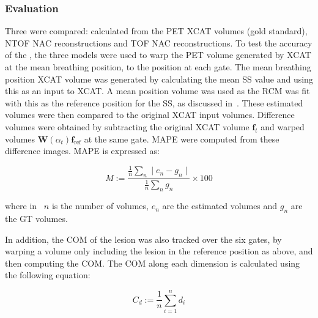             \subsubsection{Evaluation} \label{sec:impact_of_tof_on_respiratory_motion_model_estimation_using_pre_gated_no_intra_cycle_motion_nac_pet_methods_evaluation}
                Three  were compared: calculated from the \gls{PET} \gls{XCAT} volumes (gold standard), \gls{NTOF} \gls{NAC} reconstructions and \gls{TOF} \gls{NAC} reconstructions. To test the accuracy of the , the three models were used to warp the \gls{PET} volume generated by \gls{XCAT} at the mean breathing position, to the position at each gate. The mean breathing position \gls{XCAT} volume was generated by calculating the mean \gls{SS} value and using this as an input to \gls{XCAT}. A mean position volume was used as the \gls{RCM} was fit with this as the reference position for the \gls{SS}, as discussed in~. These estimated volumes were then compared to the original \gls{XCAT} input volumes. Difference volumes were obtained by subtracting the original \gls{XCAT} volume $\mathbf{f}_t$ and warped volumes $\mathbf{W}(\alpha_t) \mathbf{f}_\mathrm{ref}$ at the same gate. \gls{MAPE} were computed from these difference images. \gls{MAPE} is expressed as:
                
                \begin{equation} \label{eq:impact_of_tof_on_respiratory_motion_model_estimation_using_pre_gated_no_intra_cycle_motion_nac_pet_methods_mape}
                   M := \frac{\frac{1}{n}\sum_{n}\mid e_n - g_n \mid}{\frac{1}{n}\sum_{n}g_n} \times 100
                \end{equation}
                
                \noindent where in~ $n$ is the number of volumes, $e_n$ are the estimated volumes and $g_n$ are the \gls{GT} volumes.
                
                In addition, the \gls{COM} of the lesion was also tracked over the six gates, by warping a volume only including the lesion in the reference position as above, and then computing the \gls{COM}. The \gls{COM} along each dimension is calculated using the following equation:
                
                \begin{equation} \label{eq:impact_of_tof_on_respiratory_motion_model_estimation_using_pre_gated_no_intra_cycle_motion_nac_pet_methods_com}
                   C_{d} := \frac{1}{n}\sum_{i=1}^{n} d_{i}
                \end{equation}
                
